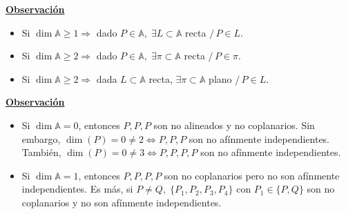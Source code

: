 \documentclass[12pt, a4paper, ones, notitlepage, openany,titlepage]{article}
\newcommand{\observacion}{\noindent\underline{\textbf{Observación}}}
\begin{document}
\observacion
\begin{itemize}
	\item Si $\dim \mathbb{A} \ge 1 \Longrightarrow$ dado $P \in \mathbb{A}, \; \exists L \subset \mathbb{A}$ recta $/\, P \in L$.
	\item Si $\dim \mathbb{A} \ge 2 \Longrightarrow$ dado $P \in \mathbb{A}, \; \exists \pi \subset \mathbb{A}$ recta $/\, P \in \pi$.
	\item Si $\dim \mathbb{A} \ge 2 \Longrightarrow$ dada $L \subset \mathbb{A}$ recta, $\exists \pi \subset \mathbb{A}$ plano $/\, P \in L$.
\end{itemize}
\observacion
\begin{itemize}
	\item Si $\dim \mathbb{A} = 0$, entonces $P, P, P$ son no alineados y no coplanarios. Sin embargo, $\dim(P) = 0 \neq 2 \Longleftrightarrow P,P,P$ son no afínmente independientes. También, $\dim(P) = 0 \neq 3 \Longleftrightarrow P,P,P,P$ son no afínmente independientes.
	\item Si $\dim \mathbb{A} = 1$, entonces $P,P,P,P$ son no coplanarios pero no son afínmente independientes. Es más, si $P \neq Q, \; \{P_1,P_2,P_3,P_4\}$ con $P_1 \in \{P,Q\}$ son no coplanarios y no son afínmente independientes.
\end{itemize}
\end{document}
